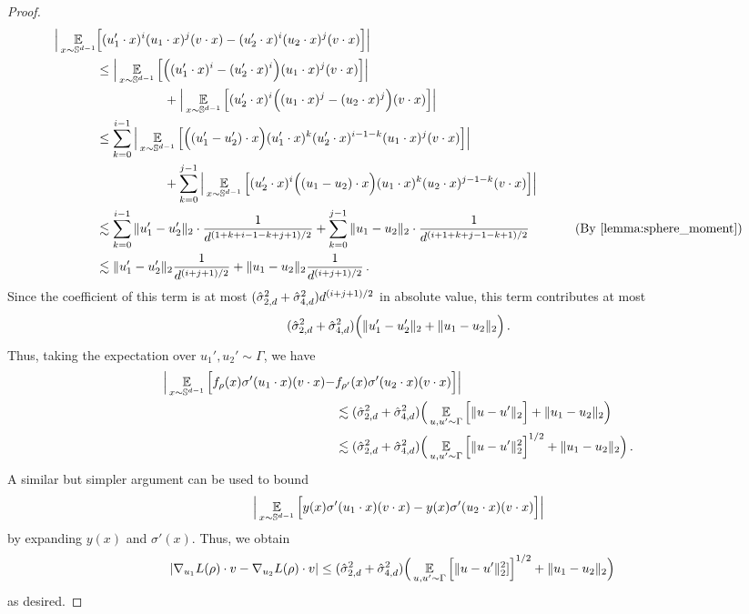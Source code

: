 \begin{proof}
\begin{align}
\Big| \E_{x \sim \bbS^{d - 1}} & \Big[ (u_1' \cdot x)^i (u_1 \cdot x)^j (v \cdot x) - (u_2' \cdot x)^i (u_2 \cdot x)^j (v \cdot x) \Big] \Big| \\
& \leq \Big| \E_{x \sim \bbS^{d - 1}} \Big[\Big((u_1' \cdot x)^i - (u_2' \cdot x)^i \Big) (u_1 \cdot x)^j (v \cdot x) \Big] \Big| \\
& \nextlinespace\nextlinespace + \Big| \E_{x \sim \bbS^{d - 1}} \Big[ (u_2' \cdot x)^i \Big((u_1 \cdot x)^j - (u_2 \cdot x)^j \Big) (v \cdot x) \Big] \Big| \\
& \leq \sum_{k = 0}^{i - 1} \Big| \E_{x \sim \bbS^{d - 1}} \Big[\Big((u_1' - u_2') \cdot x\Big) (u_1' \cdot x)^k (u_2' \cdot x)^{i - 1 - k} (u_1 \cdot x)^j (v \cdot x) \Big] \Big| \\
& \nextlinespace\nextlinespace + \sum_{k = 0}^{j - 1} \Big| \E_{x \sim \bbS^{d - 1}} \Big[(u_2' \cdot x)^i \Big((u_1 - u_2) \cdot x \Big) (u_1 \cdot x)^k (u_2 \cdot x)^{j - 1 - k} (v \cdot x) \Big] \Big| \\
& \lesssim \sum_{k = 0}^{i - 1} \|u_1' - u_2'\|_2 \cdot \frac{1}{d^{(1 + k + i - 1 - k + j + 1)/2}} + \sum_{k = 0}^{j - 1} \|u_1 - u_2\|_2 \cdot \frac{1}{d^{(i + 1 + k + j - 1 - k + 1)/2}}
& \tag{By \Cref{lemma:sphere_moment}} \\
& \lesssim \|u_1' - u_2'\|_2 \frac{1}{d^{(i + j + 1)/2}} + \|u_1 - u_2\|_2 \frac{1}{d^{(i + j + 1)/2}} \period
\end{align}
Since the coefficient of this term is at most $(\hat{\sigma}_{2, d}^2 + \hat{\sigma}_{4, d}^2) d^{(i + j + 1)/2}$ in absolute value, this term contributes at most
\begin{align}
(\hat{\sigma}_{2, d}^2 + \hat{\sigma}_{4, d}^2) \Big(\|u_1' - u_2'\|_2 + \|u_1 - u_2\|_2 \Big) \,.
\end{align}
Thus, taking the expectation over $u_1', u_2' \sim \Gamma$, we have
\begin{align}
\Big| \operatorname*{\mathbb{E}}_{x \sim \mathbb{S}^{d - 1}} \Big[ f_\rho(x) \sigma'(u_1 \cdot x) (v \cdot x) - & f_{\rho'}(x) \sigma'(u_2 \cdot x) (v \cdot x) \Big] \Big| \\
& \lesssim (\hat{\sigma}_{2, d}^2 + \hat{\sigma}_{4, d}^2) \Big(\operatorname*{\mathbb{E}}_{u, u' \sim \Gamma} \Big[ \|u - u'\|_2 \Big] + \|u_1 - u_2 \|_2 \Big) \\
& \lesssim (\hat{\sigma}_{2, d}^2 + \hat{\sigma}_{4, d}^2) \Big(\operatorname*{\mathbb{E}}_{u, u' \sim \Gamma} \Big[ \|u - u'\|_2^2 \Big]^{1/2} + \|u_1 - u_2 \|_2 \Big) \,.
\end{align}
A similar but simpler argument can be used to bound
\begin{align}
\Big| \operatorname*{\mathbb{E}}_{x \sim \mathbb{S}^{d - 1}} \Big[ y(x) \sigma'(u_1 \cdot x) (v \cdot x) - y(x) \sigma'(u_2 \cdot x) (v \cdot x) \Big] \Big|
\end{align}
by expanding $y(x)$ and $\sigma'(x)$. Thus, we obtain
\begin{align}
|\nabla_{u_1} L(\rho) \cdot v - \nabla_{u_2} L(\rho) \cdot v|
& \leq (\hat{\sigma}_{2, d}^2 + \hat{\sigma}_{4, d}^2) \Big(\operatorname*{\mathbb{E}}_{u, u' \sim \Gamma} \Big[\|u - u'\|_2^2] \Big]^{1/2} + \|u_1 - u_2\|_2 \Big)
\end{align}
as desired.
\end{proof}


